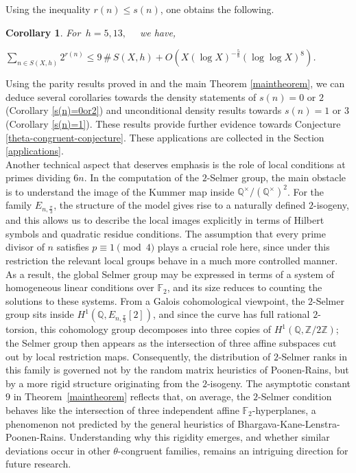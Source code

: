 \documentclass[11pt]{article}
\newcommand{\Z}{ {\mathbb{Z}} }
\newcommand{\Q}{ {\mathbb{Q}} }
\newtheorem{corollary}[theorem]{Corollary}
\begin{document}
\noindent Using the inequality $r(n)\leq s(n)$, one obtains the following. 
\begin{corollary}\label{averagerank}
For  $\, h=5,13, \quad$ we have,
\begin{center}
$\sum\limits_{n\in S(X,h)}2^{r(n)}\leq 9\,\#\, S(X,h)+ O(X(\log X)^{-\frac{5}{8}}(\log \log X)^{8})$.
\end{center}
\end{corollary}

\noindent Using the parity results proved in \cite{WeiGuo} and the main Theorem \ref{maintheorem}, we can deduce several corollaries towards the density statements of $s(n) = 0$ or $2$ (Corollary \ref{s(n)=0or2}) and unconditional density results towards $s(n) = 1$ or $3$ (Corollary \ref{s(n)=1}). These results provide further evidence towards Conjecture \ref{theta-congruent-conjecture}.  These applications are collected in the Section \ref{applications}. 
\\




\noindent 
Another technical aspect that deserves emphasis is the role of local conditions at primes dividing $6n$. In the computation of the $2$-Selmer group, the main obstacle is to understand the image of the Kummer map inside $\Q^{\times}/(\Q^{\times})^{2}$. For the family $E_{n,\frac{\pi}{3}}$, the structure of the model gives rise to a naturally defined $2$-isogeny, and this allows us to describe the local images explicitly in terms of Hilbert symbols and quadratic residue conditions. The assumption that every prime divisor of $n$ satisfies $p \equiv 1 \pmod{4}$ plays a crucial role here, since under this restriction the relevant local groups behave in a much more controlled manner. As a result, the global Selmer group may be expressed in terms of a system of homogeneous linear conditions over $\mathbb{F}_{2}$, and its size reduces to counting the solutions to these systems. From a Galois cohomological viewpoint, the $2$-Selmer group sits inside $H^{1}(\Q, E_{n,\frac{\pi}{3}}[2])$, and since the curve has full rational $2$-torsion, this cohomology group decomposes into three copies of $H^{1}(\Q, \Z/2\Z)$; the Selmer group then appears as the intersection of three affine subspaces cut out by local restriction maps. Consequently, the distribution of $2$-Selmer ranks in this family is governed not by the random matrix heuristics of Poonen-Rains, but by a more rigid structure originating from the $2$-isogeny. The asymptotic constant $9$ in Theorem~\ref{maintheorem} reflects that, on average, the $2$-Selmer condition behaves like the intersection of three independent affine $\mathbb{F}_{2}$-hyperplanes, a phenomenon not predicted by the general heuristics of Bhargava-Kane-Lenstra-Poonen-Rains. Understanding why this rigidity emerges, and whether similar deviations occur in other $\theta$-congruent families, remains an intriguing direction for future research.
\\
\end{document}
